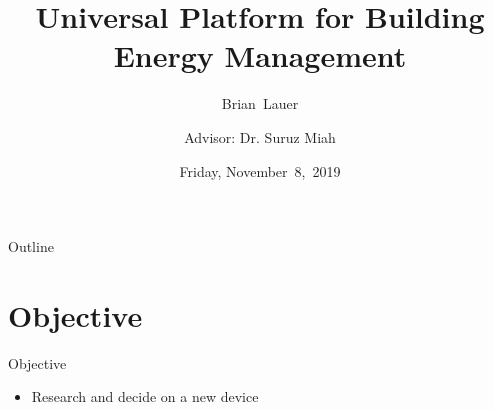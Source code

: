 \documentclass{beamer}
\title[Progress Update]{Universal Platform for Building Energy Management}
\author[B.~Lauer]{Brian~Lauer \\\and
Advisor: Dr. Suruz Miah}
\institute[Bradley University] %
{
  Department of Electrical and Computer Engineering\\
  Bradley University\\
  1501 W. Bradley Avenue\\
  Peoria, IL, 61625, USA
}
\date[November~8,~2019]{Friday, November~8,~2019}
\begin{document}
\begin{frame}
  \titlepage
\end{frame}

\begin{frame}{Outline}
  \tableofcontents
\end{frame}

\section{Objective}
\begin{frame}{Objective}
\begin{itemize}
\item Research and decide on a new device 
\end{itemize}
\end{frame}
\end{document}
